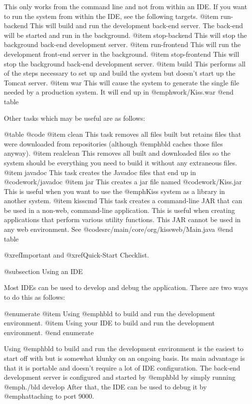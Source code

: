 This only works from the command line and not from within an IDE.
If you want to run the system from within the IDE, see the following targets.
@item run-backend
This will build and run the development back-end server.  The back-end will
be started and run in the background.
@item stop-backend
This will stop the background back-end development server.
@item run-frontend
This will run the development front-end server in the background.
@item stop-frontend
This will stop the background back-end development server.
@item build
This performs all of the steps necessary to set up and build the system but
doesn't start up the Tomcat server.
@item war
This will cause the system to generate the single file needed by a
production system.  It will end up in @emph{work/Kiss.war}
@end table

Other tasks which may be useful are as follows:

@table @code
@item clean
This task removes all files built but retains files that were downloaded from
repositories (although @emph{bld} caches those files anyway).
@item realclean
This removes all built and downloaded files so the system should be everything
you need to build it without any extraneous files.
@item javadoc
This task creates the Javadoc files that end up in @code{work/javadoc}
@item jar
This creates a jar file named @code{work/Kiss.jar} This is useful when you want to use
the @emph{Kiss} system as a library in another system.
@item kisscmd
This task creates a command-line JAR that can be used in a non-web, command-line application.
This is useful when creating applications that perform various utility functions.  This
JAR cannot be used in any web environment.  See @code{src/main/core/org/kissweb/Main.java}
@end table

@xref{Important} and @xref{Quick-Start Checklist}.

@subsection Using an IDE

Most IDEs can be used to develop and debug the application.  There are two
ways to do this as follows:

@enumerate
@item
Using @emph{bld} to build and run the development environment.
@item
Using your IDE to build and run the development environment.
@end enumerate

Using @emph{bld} to build and run the development environment is the
easiest to start off with but is somewhat klunky on an ongoing basis.
Its main advantage is that it is portable and doesn't require a lot of
IDE configuration.  The back-end development server is configured and
started by @emph{bld} by simply running @emph{./bld develop} After
that, the IDE can be used to debug it by @emph{attaching} to port
9000.

